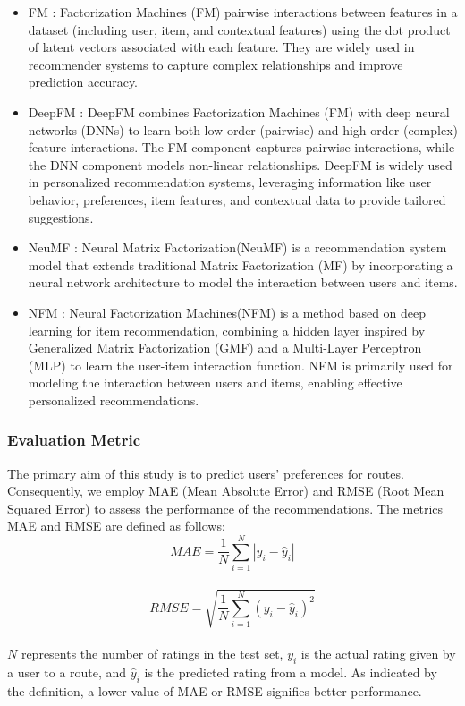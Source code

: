\documentclass[]{article}
\begin{document}
\begin{itemize}
	\item FM \cite{5694074}: Factorization Machines (FM) pairwise interactions between features in a dataset (including user, item, and contextual features) using the dot product of latent vectors associated with each feature. They are widely used in recommender systems to capture complex relationships and improve prediction accuracy.
	
	\item DeepFM \cite{Guo2017}: DeepFM combines Factorization Machines (FM) with deep neural networks (DNNs) to learn both low-order (pairwise) and high-order (complex) feature interactions. The FM component captures pairwise interactions, while the DNN component models non-linear relationships. DeepFM is widely used in personalized recommendation systems, leveraging information like user behavior, preferences, item features, and contextual data to provide tailored suggestions.
	
	\item NeuMF \cite{10.1145/3038912.3052569}: Neural Matrix Factorization(NeuMF) is a recommendation system model that extends traditional Matrix Factorization (MF) by incorporating a neural network architecture to model the interaction between users and items.

	\item NFM \cite{10.1145/3077136.3080777}: Neural Factorization Machines(NFM) is a method based on deep learning for item recommendation, combining a hidden layer inspired by Generalized Matrix Factorization (GMF) and a Multi-Layer Perceptron (MLP) to learn the user-item interaction function. NFM is primarily used for modeling the interaction between users and items, enabling effective personalized recommendations.
	
\end{itemize}

\subsubsection*{Evaluation Metric}
The primary aim of this study is to predict users' preferences for routes. Consequently, we employ MAE (Mean Absolute Error) and RMSE (Root Mean Squared Error) to assess the performance of the recommendations. The metrics MAE and RMSE are defined as follows:\\
\begin{equation}
	MAE = \frac{1}{N} \sum_{i=1}^{N} |y_i - \hat{y}_i|
\end{equation}
\\
\begin{equation}
	RMSE = \sqrt{\frac{1}{N} \sum_{i=1}^{N} (y_i - \hat{y}_i)^2}
\end{equation}
\\
$N$ represents the number of ratings in the test set, $y_i$ is the actual rating given by a user to a route, and $\hat{y}_i$ is the predicted rating from a model. As indicated by the definition, a lower value of MAE or RMSE signifies better performance.
\end{document}
